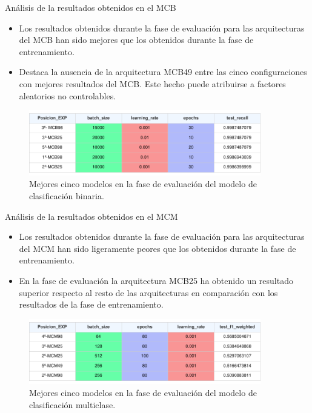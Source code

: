 \begin{frame}{Análisis de la resultados obtenidos en el MCB}
\begin{itemize}

	\item Los resultados obtenidos durante la fase de evaluación para las arquitecturas del MCB han sido mejores que los obtenidos durante la fase de entrenamiento.
	\item Destaca la ausencia de la arquitectura MCB49 entre las cinco configuraciones con mejores resultados del MCB. Este hecho puede atribuirse a factores aleatorios no controlables.
\end{itemize}
	\begin{figure}[H]
    \centering
    \includegraphics[width=0.9\textwidth]{../Memoria/img/evaluacion/resultados/top5EVALMCB.pdf}
    \caption{Mejores cinco modelos en la fase de evaluación del modelo de clasificación binaria.}
    \label{fig:top5EVALMCB}
\end{figure}
\end{frame}


\begin{frame}{Análisis de la resultados obtenidos en el MCM}
\begin{itemize}

	\item Los resultados obtenidos durante la fase de evaluación para las arquitecturas del MCM han sido ligeramente peores que los obtenidos durante la fase de entrenamiento.
	\item En la fase de evaluación la arquitectura MCB25 ha obtenido un resultado superior respecto al resto de las arquitecturas en comparación con los resultados de la fase de entrenamiento.
\end{itemize}
	\begin{figure}[H]
    \centering
    \includegraphics[width=0.9\textwidth]{../Memoria/img/evaluacion/resultados/top5EVALMCM.pdf}
    \caption{Mejores cinco modelos en la fase de evaluación del modelo de clasificación multiclase.}
    \label{fig:top5EVALMCB}
\end{figure}
\end{frame}

